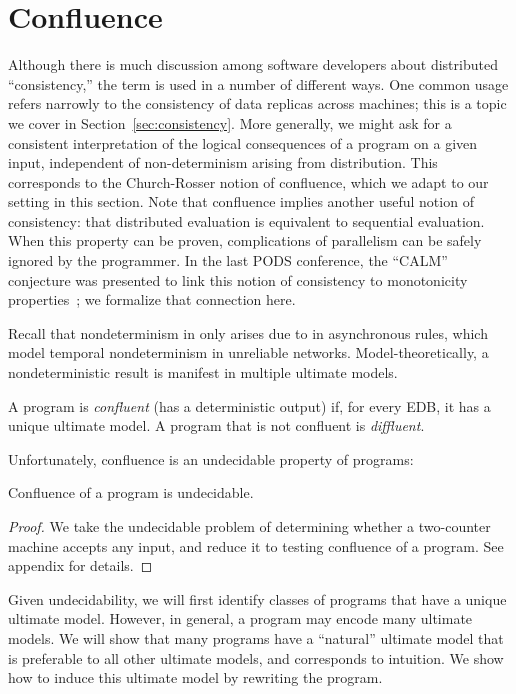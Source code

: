 \section{Confluence}
\label{sec:confluence}
Although there is much discussion among software developers about distributed ``consistency,'' the term is used in a number of different ways.  One common usage refers narrowly to the consistency of data replicas across machines; this is a topic we cover in Section~\ref{sec:consistency}.  More generally, we might ask for a consistent interpretation of the logical consequences of a program on a given input, independent of non-determinism arising from distribution. 
This corresponds to the Church-Rosser notion of confluence, which we adapt to our setting in this section.  Note that confluence implies another useful notion of consistency: that distributed evaluation is equivalent to sequential evaluation.  When this property can be proven, complications of parallelism can be safely ignored by the programmer.  In the last PODS conference, the ``CALM'' conjecture was presented to link this notion of consistency to monotonicity properties~\cite{declarative-imperative}; we formalize that connection here. 

Recall that nondeterminism in \lang only arises due to  in asynchronous rules, 
which model temporal nondeterminism in unreliable networks.
Model-theoretically, a nondeterministic result is manifest in multiple ultimate models.

\begin{definition}
A \lang program is {\em confluent} (has a deterministic output) if, for every EDB, it has a unique ultimate model.  A program that is not confluent is {\em diffluent}.
\end{definition}

Unfortunately, confluence is an undecidable property of \lang programs:

\begin{lemma}
\label{lem:confluence-undecidable}
Confluence of a \lang program is undecidable.
\end{lemma}
\begin{proof}
We take the undecidable problem of determining whether a two-counter machine accepts any input, and reduce it to testing confluence of a \lang program.  See appendix for details.
\end{proof}

Given undecidability, we will first identify classes of programs that have a unique ultimate model.  However, in general, a \lang program may encode many ultimate models.  We will show that many \lang programs have a ``natural'' ultimate model that is preferable to all other ultimate models, and corresponds to intuition.  We show how to induce this ultimate model by rewriting the program.


